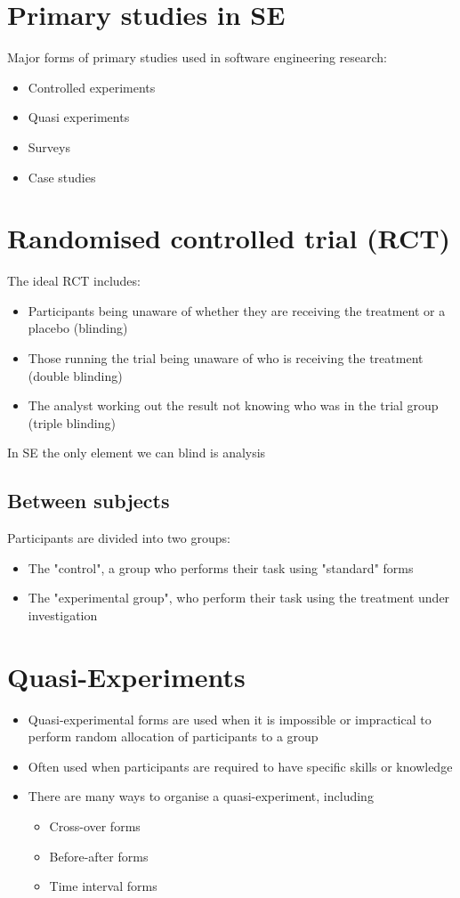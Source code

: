 \documentclass{article}[18pt]
\begin{document}
\section{Primary studies in SE}
Major forms of primary studies used in software engineering research:
\begin{itemize}
	\item Controlled experiments
	\item Quasi experiments
	\item Surveys
	\item Case studies
\end{itemize}
\section{Randomised controlled trial (RCT)}
The ideal RCT includes:
\begin{itemize}
	\item Participants being unaware of whether they are receiving the treatment or a placebo (blinding)
	\item Those running the trial being unaware of who is receiving the treatment (double blinding)
	\item The analyst working out the result not knowing who was in the trial group (triple blinding)
\end{itemize}
In SE the only element we can blind is analysis
\subsection{Between subjects}
Participants are divided into two groups:
\begin{itemize}
	\item The "control", a group who performs their task using "standard" forms
	\item The "experimental group", who perform their task using the treatment under investigation
\end{itemize}
\section{Quasi-Experiments}
\begin{itemize}
	\item Quasi-experimental forms are used when it is impossible or impractical to perform random allocation of participants to a group
	\item Often used when participants are required to have specific skills or knowledge
	\item There are many ways to organise a quasi-experiment, including
	\begin{itemize}
		\item Cross-over forms
		\item Before-after forms
		\item Time interval forms
	\end{itemize}
\end{itemize}
\end{document}
